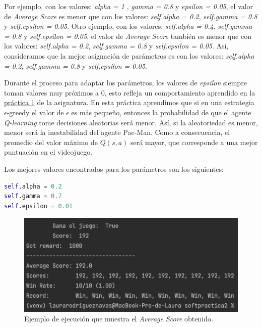 \documentclass[11pt]{exam}
\begin{document}
Por ejemplo, con los valores: \textit{alpha = 1} , \textit{gamma = 0.8} y \textit{epsilon = 0.05}, el valor de \textit{Average Score} es menor que con los valores: \textit{self.alpha = 0.2}, \textit{self.gamma = 0.8} y \textit{self.epsilon = 0.05}. Otro ejemplo, con los valores: \textit{self.alpha = 0.4}, \textit{self.gamma = 0.8} y \textit{self.epsilon = 0.05}, el valor de \textit{Average Score} también es menor que con los valores: \textit{self.alpha = 0.2}, \textit{self.gamma = 0.8} y \textit{self.epsilon = 0.05}. Así, consideramos que la mejor asignación de parámetros es con los valores: \textit{self.alpha = 0.2}, \textit{self.gamma = 0.8} y \textit{self.epsilon = 0.05}.

Durante el proceso para adaptar los parámetros, los valores de \textit{epsilon} siempre toman valores muy próximos a 0, esto refleja un comportamiento aprendido en la \href{https://poliformat.upv.es/portal/site/ESP_0_2835/tool/c07b745a-0cfd-44f0-a7a2-9bb22f80c3f7?panel=Main}{práctica 1} de la asignatura. En esta práctica aprendimos que si en una estrategia $\epsilon$-greedy el valor de $\epsilon$ es más pequeño, entonces la probabilidad de que el agente \textit{Q-learning} tome decisiones aleatorias será menor. Así, si la aleatoriedad es menor, menor será la inestabilidad del agente Pac-Man. Como a consecuencia, el promedio del valor máximo de $Q(s,a)$ será mayor, que corresponde a una mejor puntuación en el videojuego.

Los mejores valores encontrados para los parámetros son los siguientes:
\vspace*{3mm}

\begin{lstlisting}[language=python, basicstyle=\footnotesize]
self.alpha = 0.2
self.gamma = 0.7
self.epsilon = 0.01
\end{lstlisting}

\begin{figure}[H]
	\centering
	\includegraphics[scale=0.5]{figures/average_score}
	\caption{Ejemplo de ejecución que muestra el  \textit{Average Score} obtenido.}
	\label{average_score}
\end{figure}
\end{document}
